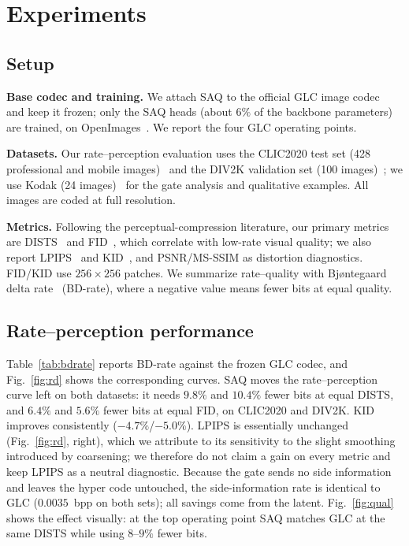 \documentclass[conference]{IEEEtran}
\begin{document}
\section{Experiments}
\label{sec:exp}

\subsection{Setup}
\textbf{Base codec and training.} We attach SAQ to the official GLC image
codec~\cite{jia2024generative} and keep it frozen; only the SAQ heads (about
$6\%$ of the backbone parameters) are trained, on
OpenImages~\cite{kuznetsova2020open}. We report the four GLC operating points.

\textbf{Datasets.} Our rate--perception evaluation uses the CLIC2020 test set
(428 professional and mobile images)~\cite{clic2020} and the DIV2K validation set
(100 images)~\cite{agustsson2017ntire}; we use Kodak (24
images)~\cite{kodak1993} for the gate analysis and qualitative examples. All
images are coded at full resolution.

\textbf{Metrics.} Following the perceptual-compression literature, our primary
metrics are DISTS~\cite{ding2022image} and FID~\cite{heusel2017gans}, which
correlate with low-rate visual quality; we also report
LPIPS~\cite{zhang2018unreasonable} and KID~\cite{binkowski2018demystifying}, and
PSNR/MS-SSIM as distortion diagnostics. FID/KID use $256\!\times\!256$ patches.
We summarize rate--quality with Bj{\o}ntegaard delta
rate~\cite{bjontegaard2001calculation} (BD-rate), where a negative value means
fewer bits at equal quality.

\subsection{Rate--perception performance}
Table~\ref{tab:bdrate} reports BD-rate against the frozen GLC codec, and
Fig.~\ref{fig:rd} shows the corresponding curves. SAQ moves the
rate--perception curve left on both datasets: it needs $9.8\%$ and $10.4\%$ fewer
bits at equal DISTS, and $6.4\%$ and $5.6\%$ fewer bits at equal FID, on CLIC2020
and DIV2K. KID improves consistently ($-4.7\%$/$-5.0\%$). LPIPS is essentially
unchanged (Fig.~\ref{fig:rd}, right), which we attribute to its sensitivity to
the slight smoothing introduced by coarsening; we therefore do not claim a gain on
every metric and keep LPIPS as a neutral diagnostic. Because the gate sends no
side information and leaves the hyper code untouched, the side-information rate is
identical to GLC ($0.0035$~bpp on both sets); all savings come from the latent.
Fig.~\ref{fig:qual} shows the effect visually: at the top operating point SAQ
matches GLC at the same DISTS while using $8$--$9\%$ fewer bits.
\end{document}

